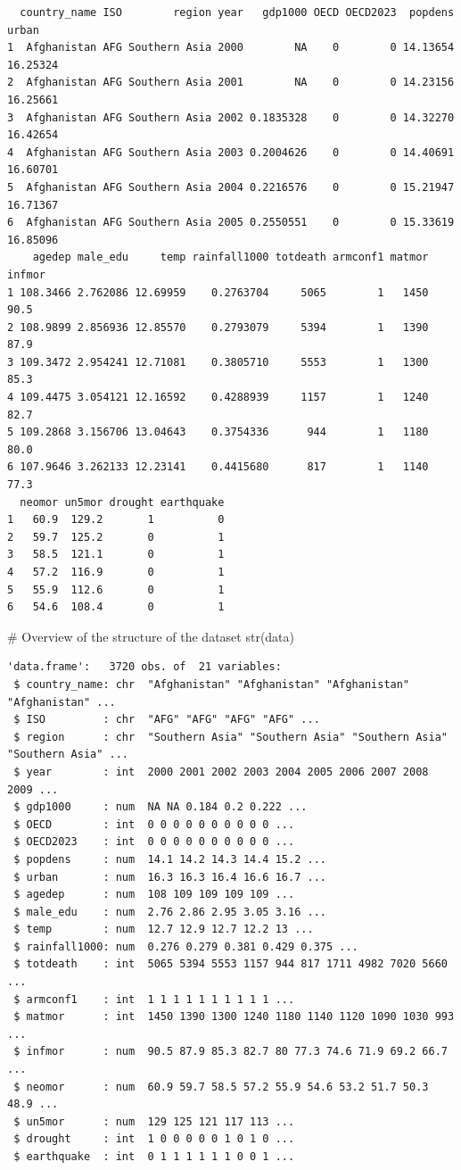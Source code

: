\documentclass[
  letterpaper,
  DIV=11,
  numbers=noendperiod]{scrartcl}
\newenvironment{Shaded}{\begin{snugshade}}{\end{snugshade}}
\newcommand{\CommentTok}[1]{\textcolor[rgb]{0.37,0.37,0.37}{#1}}
\newcommand{\FunctionTok}[1]{\textcolor[rgb]{0.28,0.35,0.67}{#1}}
\newcommand{\NormalTok}[1]{\textcolor[rgb]{0.00,0.23,0.31}{#1}}
\begin{document}
\begin{verbatim}
  country_name ISO        region year   gdp1000 OECD OECD2023  popdens    urban
1  Afghanistan AFG Southern Asia 2000        NA    0        0 14.13654 16.25324
2  Afghanistan AFG Southern Asia 2001        NA    0        0 14.23156 16.25661
3  Afghanistan AFG Southern Asia 2002 0.1835328    0        0 14.32270 16.42654
4  Afghanistan AFG Southern Asia 2003 0.2004626    0        0 14.40691 16.60701
5  Afghanistan AFG Southern Asia 2004 0.2216576    0        0 15.21947 16.71367
6  Afghanistan AFG Southern Asia 2005 0.2550551    0        0 15.33619 16.85096
    agedep male_edu     temp rainfall1000 totdeath armconf1 matmor infmor
1 108.3466 2.762086 12.69959    0.2763704     5065        1   1450   90.5
2 108.9899 2.856936 12.85570    0.2793079     5394        1   1390   87.9
3 109.3472 2.954241 12.71081    0.3805710     5553        1   1300   85.3
4 109.4475 3.054121 12.16592    0.4288939     1157        1   1240   82.7
5 109.2868 3.156706 13.04643    0.3754336      944        1   1180   80.0
6 107.9646 3.262133 12.23141    0.4415680      817        1   1140   77.3
  neomor un5mor drought earthquake
1   60.9  129.2       1          0
2   59.7  125.2       0          1
3   58.5  121.1       0          1
4   57.2  116.9       0          1
5   55.9  112.6       0          1
6   54.6  108.4       0          1
\end{verbatim}

\begin{Shaded}
\begin{Highlighting}[]
\CommentTok{\# Overview of the structure of the dataset}
\FunctionTok{str}\NormalTok{(data)}
\end{Highlighting}
\end{Shaded}

\begin{verbatim}
'data.frame':   3720 obs. of  21 variables:
 $ country_name: chr  "Afghanistan" "Afghanistan" "Afghanistan" "Afghanistan" ...
 $ ISO         : chr  "AFG" "AFG" "AFG" "AFG" ...
 $ region      : chr  "Southern Asia" "Southern Asia" "Southern Asia" "Southern Asia" ...
 $ year        : int  2000 2001 2002 2003 2004 2005 2006 2007 2008 2009 ...
 $ gdp1000     : num  NA NA 0.184 0.2 0.222 ...
 $ OECD        : int  0 0 0 0 0 0 0 0 0 0 ...
 $ OECD2023    : int  0 0 0 0 0 0 0 0 0 0 ...
 $ popdens     : num  14.1 14.2 14.3 14.4 15.2 ...
 $ urban       : num  16.3 16.3 16.4 16.6 16.7 ...
 $ agedep      : num  108 109 109 109 109 ...
 $ male_edu    : num  2.76 2.86 2.95 3.05 3.16 ...
 $ temp        : num  12.7 12.9 12.7 12.2 13 ...
 $ rainfall1000: num  0.276 0.279 0.381 0.429 0.375 ...
 $ totdeath    : int  5065 5394 5553 1157 944 817 1711 4982 7020 5660 ...
 $ armconf1    : int  1 1 1 1 1 1 1 1 1 1 ...
 $ matmor      : int  1450 1390 1300 1240 1180 1140 1120 1090 1030 993 ...
 $ infmor      : num  90.5 87.9 85.3 82.7 80 77.3 74.6 71.9 69.2 66.7 ...
 $ neomor      : num  60.9 59.7 58.5 57.2 55.9 54.6 53.2 51.7 50.3 48.9 ...
 $ un5mor      : num  129 125 121 117 113 ...
 $ drought     : int  1 0 0 0 0 0 1 0 1 0 ...
 $ earthquake  : int  0 1 1 1 1 1 1 0 0 1 ...
\end{verbatim}
\end{document}
